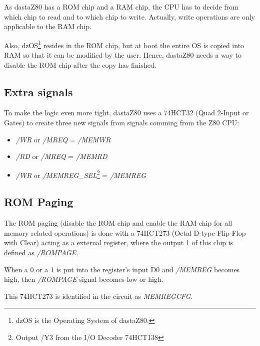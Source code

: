 \documentclass[a4paper,11pt]{article}
\begin{document}
    As dastaZ80 has a ROM chip and a RAM chip, the CPU has to decide from which 
    chip to read and to which chip to write. Actually, write operations are only
    applicable to the RAM chip.

    Also, dzOS\footnote{dzOS is the Operating System of dastaZ80.} resides in
    the ROM chip, but at boot the entire OS is copied into RAM so that it can be
    modified by the user. Hence, dastaZ80 needs a way to disable the ROM chip
    after the copy has finished.

    \subsection{Extra signals}

    To make the logic even more tight, dastaZ80 uses a 74HCT32 (Quad 2-Input or
    Gates) to create three new signals from signals comming from the Z80 CPU:

    \begin{itemize}
        \item \textit{/WR} or \textit{/MREQ} = \textit{/MEMWR}
        \item \textit{/RD} or \textit{/MREQ} = \textit{/MEMRD}
        \item \textit{/WR} or \textit{/MEMREG\_SEL}\footnote{Output /Y3 from the
        I/O Decoder 74HCT138} = \textit{/MEMREG}
    \end{itemize}

    \subsection{ROM Paging}

    The ROM paging (disable the ROM chip and enable the RAM chip for all memory
    related operations) is done with a 74HCT273 (Octal D-type Flip-Flop with
    Clear) acting as a external register, where the output 1 of this chip is 
    defined as \textit{/ROMPAGE}.

    When a 0 or a 1 is put into the register's input D0 and \textit{/MEMREG} 
    becomes high, then \textit{/ROMPAGE} signal becomes low or high.
    
    This 74HCT273 is identified in the circuit as \textit{MEMREGCFG}.
    
\end{document}
